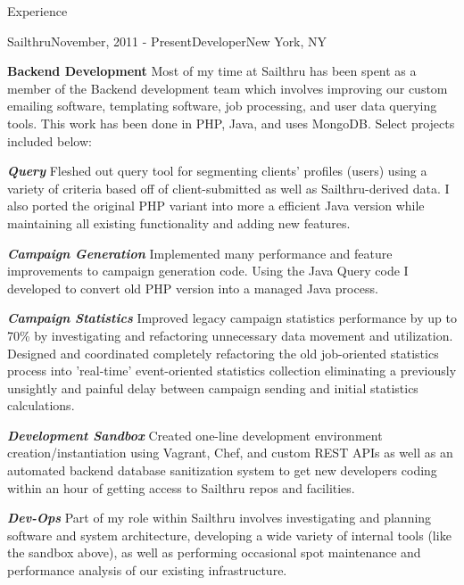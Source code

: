 \documentclass{resume} %
\begin{document}
\begin{rSection}{Experience}

\begin{rSubsection}{Sailthru}{November, 2011 - Present}{Developer}{New York, NY}
\item \textbf{Backend Development} Most of my time at Sailthru has been spent as a member of the Backend development team which involves improving our custom emailing software, templating software, job processing, and user data querying tools.  This work has been done in PHP, Java, and uses MongoDB.  Select projects included below:
\item \textbf{\textit{Query}} Fleshed out query tool for segmenting clients' profiles (users) using a variety of criteria based off of client-submitted as well as Sailthru-derived data. I also ported the original PHP variant into more a efficient Java version while maintaining all existing functionality and adding new features.
\item \textbf{\textit{Campaign Generation}} Implemented many performance and feature improvements to campaign generation code.  Using the Java Query code I developed to convert old PHP version into a managed Java process.
\item \textbf{\textit{Campaign Statistics}} Improved legacy campaign statistics performance by up to 70\% by investigating and refactoring unnecessary data movement and utilization. Designed and coordinated completely refactoring the old job-oriented statistics process into 'real-time' event-oriented statistics collection eliminating a previously unsightly and painful delay between campaign sending and initial statistics calculations.
\item \textbf{\textit{Development Sandbox}} Created one-line development environment creation/instantiation using Vagrant, Chef, and custom REST APIs as well as an automated backend database sanitization system to get new developers coding within an hour of getting access to Sailthru repos and facilities.
\item \textbf{\textit{Dev-Ops}} Part of my role within Sailthru involves investigating and planning software and system architecture, developing a wide variety of internal tools (like the sandbox above), as well as performing occasional spot maintenance and performance analysis of our existing infrastructure.
\end{rSubsection}



\end{rSection}
\end{document}
